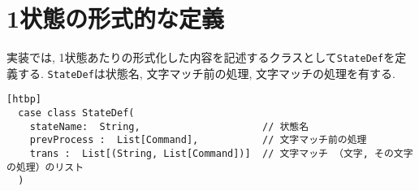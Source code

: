 \documentclass[uplatex,a4j]{jsreport}
\begin{document}




\section{1状態の形式的な定義}
\label{StateDef}
実装では, 
1状態あたりの形式化した内容を記述するクラスとして\texttt{StateDef}を定義する. 
\texttt{StateDef}は状態名, 文字マッチ前の処理, 文字マッチの処理を有する. 
\begin{lstlisting}[basicstyle=\ttfamily\footnotesize, frame=single][htbp]
  case class StateDef(
    stateName:  String,                     // 状態名
    prevProcess :  List[Command],           // 文字マッチ前の処理
    trans :  List[(String, List[Command])]  // 文字マッチ （文字, その文字の処理）のリスト
  )
\end{lstlisting}
\end{document}
